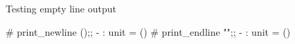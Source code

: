 Testing empty line output

\begin{ocaml}
# print_newline ();;
- : unit = ()
# print_endline "";;
- : unit = ()
\end{ocaml}
